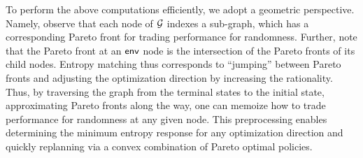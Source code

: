  To perform the above computations
efficiently, we adopt a geometric perspective. Namely, observe that
each node of $\mathcal{G}$ indexes a sub-graph, which has a corresponding
Pareto front for trading performance for randomness. Further, note
that the Pareto front at an $\mathsf{env}$ node is the intersection of the
Pareto fronts of its child nodes. Entropy matching thus corresponds to
``jumping'' between Pareto fronts and adjusting the optimization
direction by increasing the rationality.   Thus, by traversing the graph from the terminal states to
the initial state, approximating Pareto fronts along the way, one can memoize
how to trade performance for randomness at any given node. This
preprocessing enables determining the minimum entropy response for any
optimization direction and quickly replanning via a convex combination
of Pareto optimal policies.







